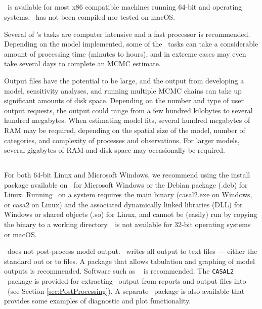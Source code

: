 \subsection{}

\CNAME\ is available for most x86 compatible machines running 64-bit  and  operating systems. \CNAME\ has not been compiled nor tested on macOS.

Several of \CNAME's tasks are computer intensive and a fast processor is recommended. Depending on the model implemented, some of the \CNAME\ tasks can take a considerable amount of processing time (minutes to hours), and in extreme cases may even take several days to complete an MCMC estimate.

Output files have the potential to be large, and the output from developing a model, sensitivity analyses, and running multiple MCMC chains can take up significant amounts of disk space. Depending on the number and type of user output requests, the output could range from a few hundred kilobytes to several hundred megabytes. When estimating model fits, several hundred megabytes of RAM may be required, depending on the spatial size of the model, number of categories, and complexity of processes and observations. For larger models, several gigabytes of RAM and disk space may occasionally be required.

\subsection{}

For both 64-bit Linux and Microsoft Windows, we recommend using the install package available on \github\ for Microsoft Windows or the Debian package (.deb) for Linux. Running \CNAME\ on a system requires the main binary (casal2.exe on Windows, or casa2 on Linux) and the associated dynamically linked libraries (DLL) for Windows or shared objects (.so) for Linux, and cannot be (easily) run by copying the binary to a working directory. \CNAME\ is not available for 32-bit operating systems or macOS.

\CNAME\ does not post-process model output. \CNAME\ writes all output to text files --- either the standard out or to files. A package that allows tabulation and graphing of model outputs is recommended. Software such as \href{http://www.r-project.org}{\R}\ \citep{R} is recommended. The \texttt{CASAL2} \R\ package is provided for extracting \CNAME\ output from reports and output files into \R\ (see Section \ref{sec:PostProcessing}). A separate \R\ package is also available that provides some examples of diagnostic and plot functionality.

